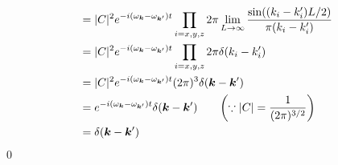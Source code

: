 \documentclass[uplatex,dvipdfmx,a4paper,11pt]{jlreq}
\makeatletter
\newcommand{\kk}{\bm{k}}
\numberwithin{equation}{section}
\theoremstyle{definition}
\renewenvironment{proof}[1][\proofname]{\par
  \normalfont
  \topsep6\p@\@plus6\p@ \trivlist
  \item[\hskip\labelsep{\bfseries #1}\@addpunct{\bfseries}]\ignorespaces\quad\par
}{%
  \qed\endtrivlist\@endpefalse
}
\renewcommand\proofname{証明}
\makeatother
\begin{document}
\begin{proof}
\begin{align}
                                                                         & = |C|^2e^{-i(\omega_{\kk} - \omega_{\kk'})t}\prod_{i=x,y,z}2\pi\lim_{L\to\infty}\frac{\sin((k_i - k_i')L/2)}{\pi(k_i - k_i')}                  \\
                                                                         & = |C|^2e^{-i(\omega_{\kk} - \omega_{\kk'})t}\prod_{i=x,y,z}2\pi\delta(k_i - k_i')                                                              \\
                                                                         & = |C|^2e^{-i(\omega_{\kk} - \omega_{\kk'})t}(2\pi)^3\delta(\kk - \kk')                                                                         \\
                                                                         & = e^{-i(\omega_{\kk} - \omega_{\kk'})t}\delta(\kk - \kk') \qquad \qty(\because |C| = \frac{1}{(2\pi)^{3/2}})                                   \\
                                                                         & = \delta(\kk - \kk')
  \end{align}
\end{proof}
\end{document}
